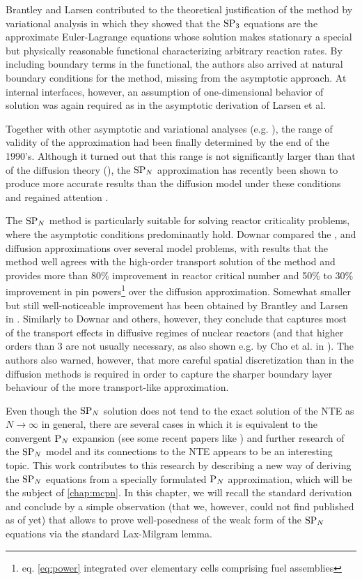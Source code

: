 Brantley and Larsen \cite{Brantley1} contributed to the theoretical justification of the method by
variational analysis in which they showed that the $\SPN[3]$ equations are the approximate Euler-Lagrange equations
whose solution makes stationary a special but physically reasonable functional characterizing arbitrary reaction rates. By
including boundary terms in the functional, the authors also arrived at natural boundary conditions for the method,
missing from the asymptotic approach. At internal interfaces, however, an assumption of one-dimensional behavior of
solution was again required as in the asymptotic derivation of Larsen et al.

Together with other asymptotic and variational analyses (e.g. \cite{Pomraning1}), the range of validity of the
approximation had been finally determined by the end of the 1990's. Although it turned out that this range is not
significantly larger than that of the diffusion theory (\cite{Larsen1}), the $\SPN$ approximation has recently been shown to produce more 
accurate results than the diffusion model under these conditions and regained attention
\cite{Frank1,McClarren1,Ragusa1,Larsen3,Kirschenmann1,Olbrant}.

The $\SPN$ method is particularly suitable for solving reactor criticality problems, where the asymptotic conditions
predominantly hold. Downar \cite{Downar} compared the \SN[16], \SPN[3] and diffusion approximations over several model
problems, with results that the \SPN[3] method well agrees with the high-order transport solution of the \SN[16] method
and provides more than 80\% improvement in reactor critical number and 50\% to 30\% improvement in pin
powers\footnote{eq. \eqref{eq:power} integrated over elementary cells comprising fuel assemblies} over the diffusion
approximation.
Somewhat smaller but still well-noticeable improvement has been obtained by Brantley and Larsen in \cite{Brantley1}.
Similarly to Downar and others, however, they conclude that \SPN[3] captures most of the transport effects in diffusive
regimes of nuclear reactors (and that higher orders than 3 are not usually necessary, as also shown e.g. by Cho et al.
in \cite{ChoAxialSPN}).
The authors also warned, however, that more careful spatial discretization than in the
diffusion methods is required in order to capture the sharper boundary layer behaviour of the more transport-like
\SPN[3] approximation.

Even though the $\SPN$ solution does not tend to the
exact solution of the NTE as $N\to\infty$ in general, there are several cases in which it is equivalent to the
convergent $\PN$ expansion (see some recent papers like \cite{Coppa2,McClarren2,Larsen2}) and further research of the
$\SPN$ model and its connections to the NTE appears to be an interesting topic. This work contributes to this research
by describing a new way of deriving the $\SPN$ equations from a specially formulated $\PN$ approximation, which will be
the subject of \cref{chap:mcpn}. In this chapter, we will recall the standard derivation and conclude by a simple observation (that
we, however, could not find published as of yet) that allows to prove well-posedness of the weak form of the $\SPN$
equations via the standard Lax-Milgram lemma. 



